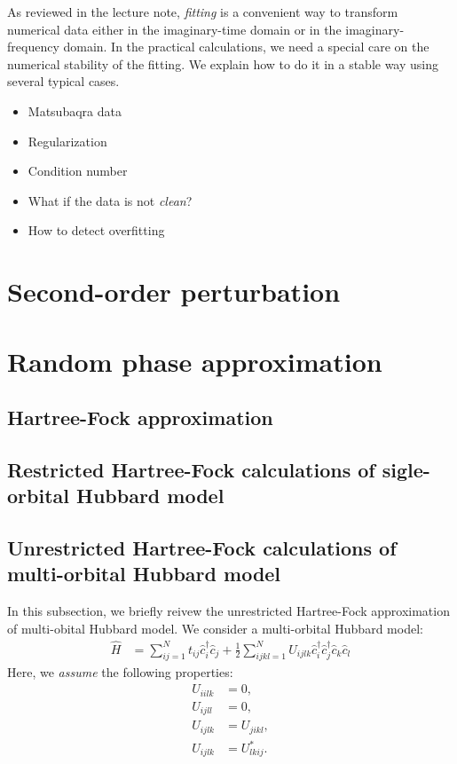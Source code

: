 \documentclass[submission, LectureNotes]{SciPost}
\begin{document}
As reviewed in the lecture note, \textit{fitting} is a convenient way to transform numerical data either in the imaginary-time domain or in the imaginary-frequency domain.
In the practical calculations, we need a special care on the numerical stability of the fitting.
We explain how to do it in a stable way using several typical cases.

\begin{itemize}
    \item Matsubaqra data
    \item Regularization
    \item Condition number
    \item What if the data is not \textit{clean}?
    \item How to detect overfitting
\end{itemize}

\clearpage
\section{Second-order perturbation}

\clearpage
\section{Random phase approximation}
\subsection{Hartree-Fock approximation}
\clearpage
\subsection{Restricted Hartree-Fock calculations of sigle-orbital Hubbard model}

\clearpage
\subsection{Unrestricted Hartree-Fock calculations of multi-orbital Hubbard model}
In this subsection, we briefly reivew the unrestricted Hartree-Fock approximation of multi-obital Hubbard model.
We consider a multi-orbital Hubbard model:
\begin{align}
    \hat{H} &= \sum_{ij=1}^N t_{ij} \hat{c}^\dagger_i \hat{c}_j + \frac{1}{2} \sum_{ijkl=1}^N U_{ijlk}\hat{c}^\dagger_i \hat{c}^\dagger_j \hat{c}_k \hat{c}_l
\end{align}
Here, we \textit{assume} the following properties:
\begin{align}
U_{iilk} &= 0,\label{eq:U-prop-start}\\
U_{ijll} &= 0,\\
U_{ijlk} &= U_{jikl}, \\
U_{ijlk} &= U_{lkij}^*.\label{eq:U-prop-end}
\end{align}
\end{document}
